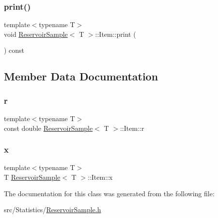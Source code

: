\subsubsection{\texorpdfstring{print()}{print()}}
{\footnotesize\ttfamily template$<$typename T$>$ \\
void \hyperlink{class_reservoir_sample}{Reservoir\+Sample}$<$ T $>$\+::Item\+::print (\begin{DoxyParamCaption}{ }\end{DoxyParamCaption}) const\hspace{0.3cm}{\ttfamily [inline]}}



\subsection{Member Data Documentation}
\mbox{\label{struct_reservoir_sample_1_1_item_ad74b6fb33eb3a534eeb4141c735dfaf5}} 
\subsubsection{\texorpdfstring{r}{r}}
{\footnotesize\ttfamily template$<$typename T$>$ \\
const double \hyperlink{class_reservoir_sample}{Reservoir\+Sample}$<$ T $>$\+::Item\+::r}

\mbox{\label{struct_reservoir_sample_1_1_item_abc1ea374480d6d86d0466e4683c98337}} 
\subsubsection{\texorpdfstring{x}{x}}
{\footnotesize\ttfamily template$<$typename T$>$ \\
T \hyperlink{class_reservoir_sample}{Reservoir\+Sample}$<$ T $>$\+::Item\+::x}



The documentation for this class was generated from the following file\+:\begin{DoxyCompactItemize}
\item 
src/\+Statistics/\hyperlink{_reservoir_sample_8h}{Reservoir\+Sample.\+h}\end{DoxyCompactItemize}
